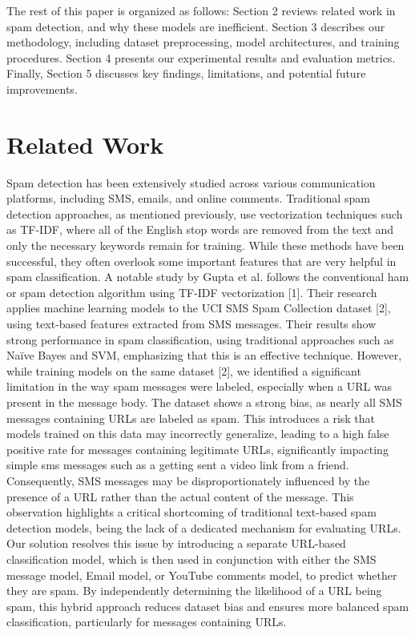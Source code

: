 \documentclass{article}
\begin{document}
\newline
\newline
The rest of this paper is organized as follows: Section 2 reviews related work in spam detection, and why these models are inefficient. Section 3 describes our methodology, including dataset preprocessing, model architectures, and training procedures. Section 4 presents our experimental results and evaluation metrics. Finally, Section 5 discusses key findings, limitations, and potential future improvements.


\section{Related Work}
Spam detection has been extensively studied across various communication platforms, including SMS, emails, and online comments. Traditional spam detection approaches, as mentioned previously, use vectorization techniques such as TF-IDF, where all of the English stop words are removed from the text and only the necessary keywords remain for training. While these methods have been successful, they often overlook some important features that are very helpful in spam classification.
\newline
\newline
A notable study by Gupta et al. follows the conventional ham or spam detection algorithm using TF-IDF vectorization [1]. Their research applies machine learning models to the UCI SMS Spam Collection dataset [2], using text-based features extracted from SMS messages. Their results show strong performance in spam classification, using traditional approaches such as Naïve Bayes and SVM, emphasizing that this is an effective technique.
\newline
\newline
However, while training models on the same dataset [2], we identified a significant limitation in the way spam messages were labeled, especially when a URL was present in the message body. The dataset shows a strong bias, as nearly all SMS messages containing URLs are labeled as spam. This introduces a risk that models trained on this data may incorrectly generalize, leading to a high false positive rate for messages containing legitimate URLs, significantly impacting simple sms messages such as a getting sent a video link from a friend. Consequently, SMS messages may be disproportionately influenced by the presence of a URL rather than the actual content of the message.
\newline
\newline
This observation highlights a critical shortcoming of traditional text-based spam detection models, being the lack of a dedicated mechanism for evaluating URLs. Our solution resolves this issue by introducing a separate URL-based classification model, which is then used in conjunction with either the SMS message model, Email model, or YouTube comments model, to predict whether they are spam. By independently determining the likelihood of a URL being spam, this hybrid approach reduces dataset bias and ensures more balanced spam classification, particularly for messages containing URLs.	
\end{document}
